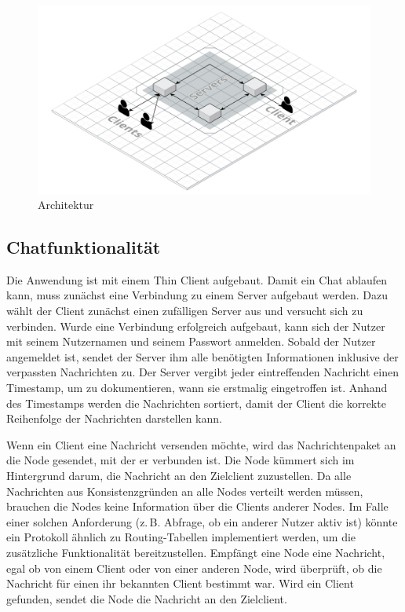 
\begin{figure}[h]
    \centering
    \includegraphics[width=\textwidth]{architecture.png}
    
    \caption{Architektur}
\end{figure}

\author{Matthias Vonend}
\subsection{Chatfunktionalität}\label{Chatfunktionalitaet}
Die Anwendung ist mit einem Thin Client aufgebaut. Damit ein Chat ablaufen kann, muss zunächst eine Verbindung zu einem Server aufgebaut werden.
Dazu wählt der Client zunächst einen zufälligen Server aus und versucht sich zu verbinden.
Wurde eine Verbindung erfolgreich aufgebaut, kann sich der Nutzer mit seinem Nutzernamen und seinem Passwort anmelden.
Sobald der Nutzer angemeldet ist, sendet der Server ihm alle benötigten Informationen inklusive der verpassten
Nachrichten zu. Der Server vergibt jeder eintreffenden Nachricht einen Timestamp, um zu dokumentieren, wann sie erstmalig eingetroffen ist.
Anhand des Timestamps werden die Nachrichten sortiert, damit der Client die korrekte Reihenfolge der Nachrichten darstellen kann.

Wenn ein Client eine Nachricht versenden möchte, wird das Nachrichtenpaket an die Node gesendet, mit der er verbunden ist.
Die Node kümmert sich im Hintergrund darum, die Nachricht an den Zielclient zuzustellen. 
Da alle Nachrichten aus Konsistenzgründen an alle Nodes verteilt werden müssen,
brauchen die Nodes keine Information über die Clients anderer Nodes. Im Falle einer solchen Anforderung
(z.\,B. Abfrage, ob ein anderer Nutzer aktiv ist) könnte ein Protokoll ähnlich zu Routing-Tabellen implementiert werden, um die zusätzliche Funktionalität bereitzustellen.
Empfängt eine Node eine Nachricht, egal ob von einem Client oder von einer anderen Node,
wird überprüft, ob die Nachricht für einen ihr bekannten Client bestimmt war. Wird ein Client gefunden, sendet die Node die Nachricht an den Zielclient.

